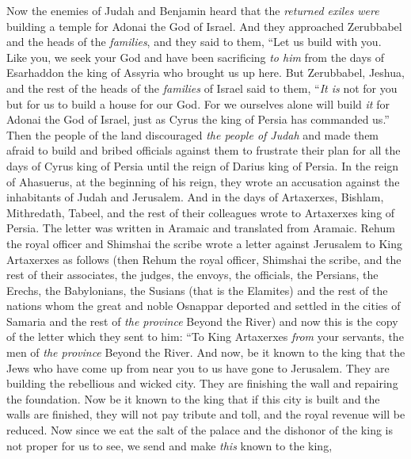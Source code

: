 \begin{biblechapter} %
 Now the enemies of Judah and Benjamin heard that the \textit{returned exiles} \textit{were} building a temple for Adonai the God of Israel.
\verse And they approached Zerubbabel and the heads of the \textit{families}, and they said to them, “Let us build with you. Like you, we seek your God and have been sacrificing \textit{to him} from the days of Esarhaddon the king of Assyria who brought us up here.
\verse But Zerubbabel, Jeshua, and the rest of the heads of the \textit{families} of Israel said to them, “\textit{It is} not for you but for us to build a house for our God. For we ourselves alone will build \textit{it} for Adonai the God of Israel, just as Cyrus the king of Persia has commanded us.”
\verse Then the people of the land discouraged \textit{the people of Judah} and made them afraid to build
\verse and bribed officials against them to frustrate their plan for all the days of Cyrus king of Persia until the reign of Darius king of Persia.
 In the reign of Ahasuerus, at the beginning of his reign, they wrote an accusation against the inhabitants of Judah and Jerusalem.
\verse And in the days of Artaxerxes, Bishlam, Mithredath, Tabeel, and the rest of their colleagues wrote to Artaxerxes king of Persia. The letter was written in Aramaic and translated from Aramaic.
\verse Rehum the royal officer and Shimshai the scribe wrote a letter against Jerusalem to King Artaxerxes as follows
\verse (then Rehum the royal officer, Shimshai the scribe, and the rest of their associates, the judges, the envoys, the officials, the Persians, the Erechs, the Babylonians, the Susians (that is the Elamites)
\verse and the rest of the nations whom the great and noble Osnappar deported and settled in the cities of Samaria and the rest of \textit{the province} Beyond the River) and now
\verse this is the copy of the letter which they sent to him:
\verse “To King Artaxerxes \textit{from} your servants, the men of \textit{the province} Beyond the River. And now,
\verse be it known to the king that the Jews who have come up from near you to us have gone to Jerusalem. They are building the rebellious and wicked city. They are finishing the wall and repairing the foundation.
\verse Now be it known to the king that if this city is built and the walls are finished, they will not pay tribute and toll, and the royal revenue will be reduced.
\verse Now since we eat the salt of the palace and the dishonor of the king is not proper for us to see, we send and make \textit{this} known to the king,

\end{biblechapter}

